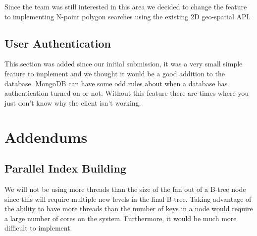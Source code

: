 \documentclass{dependencies/acm_proc_article-sp}
\begin{document}
Since the team was still interested in this area we decided to change the feature to
implementing N-point polygon searches using the existing 2D geo-spatial API.

\subsection{User Authentication}
This section was added since our initial submission, it was a very small simple feature to implement
and we thought it would be a good addition to the database. MongoDB can have some
odd rules about when a database has authentication turned on or not. Without
this feature there are times where you just don't know why the client isn't working.

\section{Addendums}

\subsection{Parallel Index Building}
We will not be using more threads than the size of the fan out of a B-tree node
since this will require multiple new levels in the final B-tree. Taking advantage of
the ability to have more threads than the number of keys in a node would require
a large number of cores on the system. Furthermore, it would be much more difficult
to implement.
\end{document}
